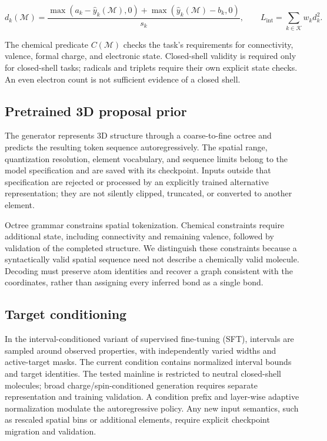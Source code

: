 \documentclass[11pt,a4paper]{article}
\begin{document}
\[
d_k(\mathcal{M})=\frac{\max(a_k-\hat y_k(\mathcal{M}),0)+\max(\hat y_k(\mathcal{M})-b_k,0)}{s_k},
\qquad L_{\mathrm{int}}=\sum_{k\in\mathcal{K}}w_k d_k^2.
\]

The chemical predicate \(C(\mathcal{M})\) checks the task's requirements
for connectivity, valence, formal charge, and electronic state.
Closed-shell validity is required only for closed-shell tasks; radicals
and triplets require their own explicit state checks. An even electron
count is not sufficient evidence of a closed shell.

\FloatBarrier
\subsection{Pretrained 3D proposal
prior}\label{pretrained-3d-proposal-prior}

The generator represents 3D structure through a coarse-to-fine octree
and predicts the resulting token sequence autoregressively. The spatial
range, quantization resolution, element vocabulary, and sequence limits
belong to the model specification and are saved with its checkpoint.
Inputs outside that specification are rejected or processed by an
explicitly trained alternative representation; they are not silently
clipped, truncated, or converted to another element.

Octree grammar constrains spatial tokenization. Chemical constraints
require additional state, including connectivity and remaining valence,
followed by validation of the completed structure. We distinguish these
constraints because a syntactically valid spatial sequence need not
describe a chemically valid molecule. Decoding must preserve atom
identities and recover a graph consistent with the coordinates, rather
than assigning every inferred bond as a single bond.

\FloatBarrier
\subsection{Target conditioning}\label{target-conditioning}

In the interval-conditioned variant of supervised fine-tuning (SFT),
intervals are sampled around observed properties, with independently
varied widths and active-target masks. The current condition contains
normalized interval bounds and target identities. The tested mainline is
restricted to neutral closed-shell molecules; broad
charge/spin-conditioned generation requires separate representation and
training validation. A condition prefix and layer-wise adaptive
normalization modulate the autoregressive policy. Any new input
semantics, such as rescaled spatial bins or additional elements, require
explicit checkpoint migration and validation.
\end{document}
